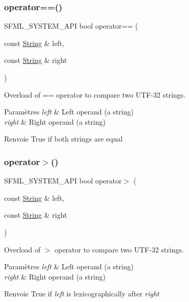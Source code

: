 \subsubsection{\texorpdfstring{operator==()}{operator==()}}
{\footnotesize\ttfamily S\+F\+M\+L\+\_\+\+S\+Y\+S\+T\+E\+M\+\_\+\+A\+PI bool operator== (\begin{DoxyParamCaption}\item[{const \hyperlink{classsf_1_1String}{String} \&}]{left,  }\item[{const \hyperlink{classsf_1_1String}{String} \&}]{right }\end{DoxyParamCaption})\hspace{0.3cm}{\ttfamily [related]}}



Overload of == operator to compare two U\+T\+F-\/32 strings. 


\begin{DoxyParams}{Paramètres}
{\em left} & Left operand (a string) \\
\hline
{\em right} & Right operand (a string)\\
\hline
\end{DoxyParams}
\begin{DoxyReturn}{Renvoie}
True if both strings are equal 
\end{DoxyReturn}
\mbox{\label{classsf_1_1String_a5efc1eca58cf5c17d01eb8501d303538}} 
\subsubsection{\texorpdfstring{operator$>$()}{operator>()}}
{\footnotesize\ttfamily S\+F\+M\+L\+\_\+\+S\+Y\+S\+T\+E\+M\+\_\+\+A\+PI bool operator$>$ (\begin{DoxyParamCaption}\item[{const \hyperlink{classsf_1_1String}{String} \&}]{left,  }\item[{const \hyperlink{classsf_1_1String}{String} \&}]{right }\end{DoxyParamCaption})\hspace{0.3cm}{\ttfamily [related]}}



Overload of $>$ operator to compare two U\+T\+F-\/32 strings. 


\begin{DoxyParams}{Paramètres}
{\em left} & Left operand (a string) \\
\hline
{\em right} & Right operand (a string)\\
\hline
\end{DoxyParams}
\begin{DoxyReturn}{Renvoie}
True if {\itshape left} is lexicographically after {\itshape right} 
\end{DoxyReturn}
\mbox{\label{classsf_1_1String_a8d2979d7829d6616330a768956f251e1}} 
